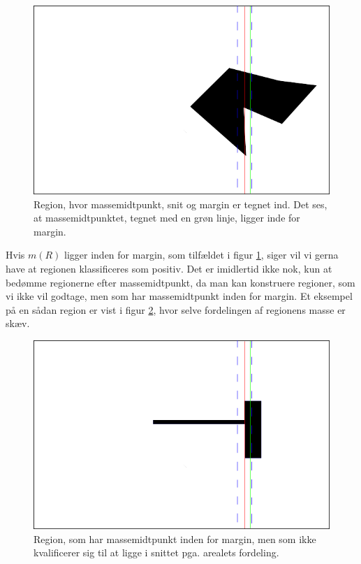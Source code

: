{\begin{figure}[h]
    \begin{center}
        \includegraphics[scale=0.5,angle=0]{afsnit/vores_implementation/billeder/udvidet_loesning/cOMCutMargin.png}
    \end{center}
    \caption[]{Region, hvor massemidtpunkt, snit og margin er tegnet
    ind. Det ses, at massemidtpunktet, tegnet med en grøn linje, ligger
    inde for margin.}
    \label{cOMCutMargin}
\end{figure}

Hvis $m(R)$ ligger inden for margin, som tilfældet i figur
\ref{cOMCutMargin}, siger vil vi gerna have at regionen klassificeres
som positiv. Det er imidlertid ikke nok, kun at bedømme regionerne efter
massemidtpunkt, da man kan konstruere regioner, som vi ikke vil godtage,
men som har massemidtpunkt inden for margin. Et eksempel på en sådan
region er vist i figur \ref{dontwork}, hvor selve fordelingen af
regionens masse er skæv.

\begin{figure}[h]
    \begin{center}
        \includegraphics[scale=0.5,angle=0]{afsnit/vores_implementation/billeder/udvidet_loesning/dontWork.png}
    \end{center}
    \caption[]{Region, som har massemidtpunkt inden for margin, men som
    ikke kvalificerer sig til at ligge i snittet pga. arealets
    fordeling.}
    \label{dontwork}
\end{figure}

}
